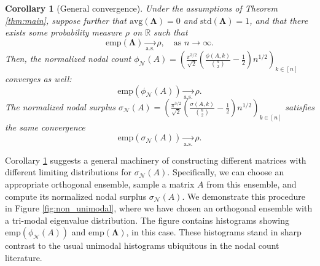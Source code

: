 \documentclass[reqno]{amsart}
\numberwithin{equation}{section}
\newcommand\R{\mathbb{R}}
\newcommand{\emp}{\mathrm{emp}}
\newtheorem{corollary}[theorem]{Corollary}
\begin{document}
\begin{corollary}[General convergence] \label{cor:conver}
Under the assumptions of Theorem \ref{thm:main}, suppose further that $\mathrm{avg}(\bm{\Lambda}) = 0$ and $\mathrm{std}(\bm{\Lambda}) = 1$, and that there exists some probability measure $\rho$ on $\R$ such that
$$\mathrm{emp}(\bm{\Lambda}) \underset{\mathrm{a.s.}}{\longrightarrow} \rho, \quad \text{as $n\to\infty$}.$$
Then, the normalized nodal count $\phi_{\mathcal{N}}(A)=\left(\frac{\pi^{3/2}}{\sqrt{2}}\left(\frac{\phi(A,k)}{{n \choose 2}}-\frac{1}{2}\right)n^{1/2}\right)_{k\in[n]}$ converges as well:
$$\emp\left(\phi_{\mathcal{N}}(A)\right)\underset{\mathrm{a.s.}}{\longrightarrow} \rho.$$
The normalized nodal surplus $\sigma_{\mathcal{N}}(A)=\left(\frac{\pi^{3/2}}{\sqrt{2}}\left(\frac{\sigma(A,k)}{{n \choose 2}}-\frac{1}{2}\right)n^{1/2}\right)_{k\in[n]}$ satisfies the same convergence
$$\emp\left(\sigma_{\mathcal{N}}(A)\right)\underset{\mathrm{a.s.}}{\longrightarrow} \rho.$$


\end{corollary} 
Corollary \ref{cor:conver} suggests a general machinery of constructing different matrices with different limiting distributions for $\sigma_{\mathcal{N}}(A)$. Specifically, we can choose an appropriate orthogonal ensemble, sample a matrix $A$ from this ensemble, and compute its normalized nodal surplus $\sigma_{\mathcal{N}}(A)$. 
We demonstrate this procedure in Figure \ref{fig:non_unimodal}, where we have chosen an orthogonal ensemble with a tri-modal eigenvalue distribution. The figure contains histograms showing $\emp\left(\phi_{\mathcal{N}}(A)\right)$ and $\emp(\bm{\Lambda})$, in this case. These histograms stand in sharp contrast to the usual unimodal histograms ubiquitous in the nodal count literature. 
\end{document}
